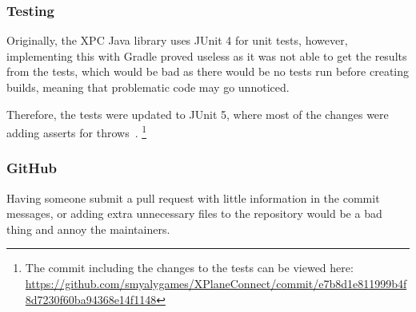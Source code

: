 \documentclass[../dissertation.tex]{subfiles}
\begin{document}
\subsubsection{Testing}
Originally, the XPC Java library uses JUnit 4 for unit tests, however, implementing this
with Gradle proved useless as it was not able to get the results from the tests,
which would be bad as there would be no tests run before creating builds, meaning that
problematic code may go unnoticed.

Therefore, the tests were updated to JUnit 5, where most of the changes were adding asserts
for throws~\cite{junit:migrate}.%
\footnote{The commit including the changes to the tests can be viewed here:
  \url{https://github.com/smyalygames/XPlaneConnect/commit/e7b8d1e811999b4f8d7230f60ba94368e14f1148}}

\subsubsection{GitHub}

Having someone submit a pull request with little information in the commit messages,
or adding extra unnecessary files to the repository would be a bad thing and annoy the
maintainers.
\end{document}
